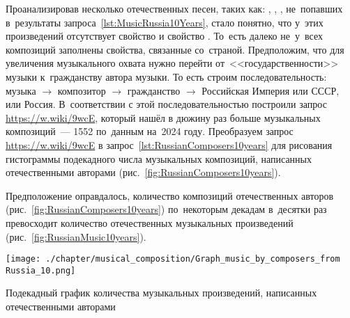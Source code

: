 Проанализировав несколько отечественных песен, таких как: 
, 
, 
, 
не~попавших в~результаты запроса~\ref{lst:MusicRussia10Years}, стало понятно, 
что у~этих произведений отсутствует свойство  и свойство . 
То~есть далеко не~у~всех композиций заполнены свойства, 
связанные со~страной. 
Предположим, что для увеличения музыкального охвата нужно перейти от~<<государственности>> музыки 
к~гражданству автора музыки. 
То есть строим последовательность: музыка $\rightarrow$ композитор $\rightarrow$ 
гражданство $\rightarrow$ Российская Империя или СССР, или Россия.
В~соответствии с этой последовательностью построили запрос \href{https://w.wiki/9wcE}
                                                                {https://w.wiki/9wcE}, 
который нашёл в дюжину раз больше музыкальных композиций~--- 1552 по~данным на~2024 году. 
Преобразуем запрос \href{https://w.wiki/9wcE}
                        {https://w.wiki/9wcE} в запрос~\ref{lst:RussianComposers10years} 
для рисования гистограммы подекадного числа музыкальных композиций, 
написанных отечественными авторами (рис.~\ref{fig:RussianComposers10years}). 

Предположение оправдалось, количество композиций отечественных авторов 
(рис.~\ref{fig:RussianComposers10years}) 
по~некоторым декадам в~десятки раз превосходит 
количество отечественных музыкальных произведений (рис.~\ref{fig:RussianMusic10years}).


\begin{marginfigure}[0\baselineskip]
	\texttt{[image: ./chapter/musical\_composition/Graph\_music\_by\_composers\_from Russia\_10.png]}
    \vspace{-7pt}
	\caption{Подекадный график количества музыкальных произведений, написанных отечественными авторами}%
	\label{fig:RussianComposers10years}%
\end{marginfigure}


